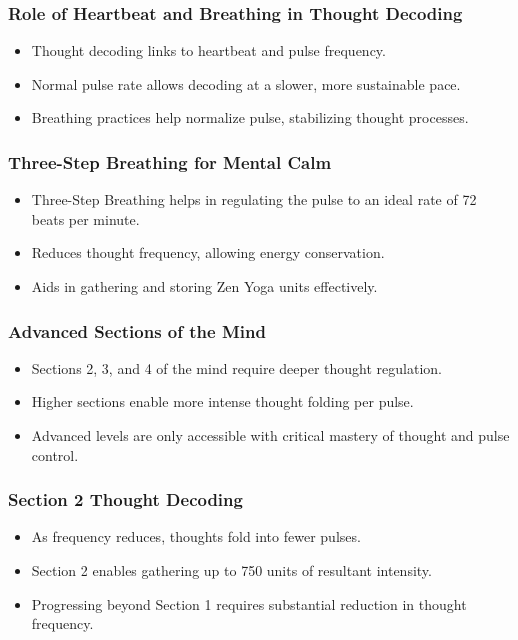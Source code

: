 \begin{frame}[fragile]\frametitle{Role of Heartbeat and Breathing in Thought Decoding}
    \begin{itemize}
        \item Thought decoding links to heartbeat and pulse frequency.
        \item Normal pulse rate allows decoding at a slower, more sustainable pace.
        \item Breathing practices help normalize pulse, stabilizing thought processes.
    \end{itemize}
\end{frame}

\begin{frame}[fragile]\frametitle{Three-Step Breathing for Mental Calm}
    \begin{itemize}
        \item Three-Step Breathing helps in regulating the pulse to an ideal rate of 72 beats per minute.
        \item Reduces thought frequency, allowing energy conservation.
        \item Aids in gathering and storing Zen Yoga units effectively.
    \end{itemize}
\end{frame}

\begin{frame}[fragile]\frametitle{Advanced Sections of the Mind}
    \begin{itemize}
        \item Sections 2, 3, and 4 of the mind require deeper thought regulation.
        \item Higher sections enable more intense thought folding per pulse.
        \item Advanced levels are only accessible with critical mastery of thought and pulse control.
    \end{itemize}
\end{frame}

\begin{frame}[fragile]\frametitle{Section 2 Thought Decoding}
    \begin{itemize}
        \item As frequency reduces, thoughts fold into fewer pulses.
        \item Section 2 enables gathering up to 750 units of resultant intensity.
        \item Progressing beyond Section 1 requires substantial reduction in thought frequency.
    \end{itemize}
\end{frame}

